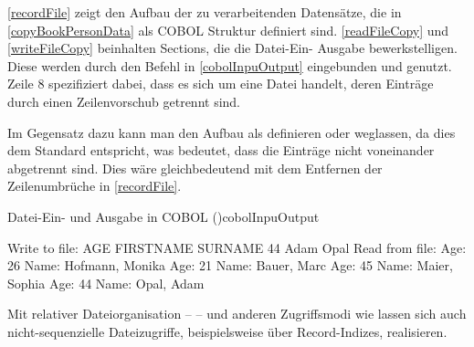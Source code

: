 

\autoref{recordFile} zeigt den Aufbau der zu verarbeitenden Datensätze, die in \autoref{copyBookPersonData} als COBOL Struktur definiert sind. \autoref{readFileCopy} und \autoref{writeFileCopy} beinhalten Sections, die die Datei-Ein- \bzw Ausgabe bewerkstelligen. Diese werden durch den  Befehl in \autoref{cobolInpuOutput} eingebunden und genutzt. Zeile 8 spezifiziert dabei, dass es sich um eine Datei handelt, deren Einträge durch einen Zeilenvorschub getrennt sind. 



Im Gegensatz dazu kann man den Aufbau als  \bzw {} definieren oder weglassen, da dies dem Standard entspricht, was bedeutet, dass die Einträge nicht voneinander abgetrennt sind. Dies wäre gleichbedeutend mit dem Entfernen der Zeilenumbrüche in \autoref{recordFile}.

\begin{codeWithCaption}{Datei-Ein- und Ausgabe in COBOL (\vgl \cite{university_of_limerick_department})}{cobolInpuOutput}
     \cFollow
    \begin{shellwindow}
    Write to file:
    AGE FIRSTNAME SURNAME
     44      Adam    Opal
    Read from file:
    Age:  26 Name: Hofmann,    Monika
    Age:  21 Name:   Bauer,      Marc
    Age:  45 Name:   Maier,    Sophia
    Age:  44 Name:    Opal,      Adam
    \end{shellwindow}
\end{codeWithCaption}

Mit relativer Dateiorganisation --  -- und anderen Zugriffsmodi wie  lassen sich auch nicht-sequenzielle Dateizugriffe, beispielsweise über Record-Indizes, realisieren.